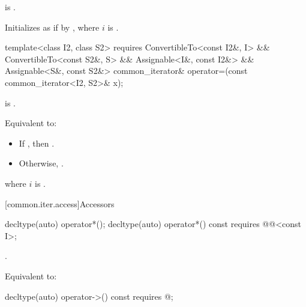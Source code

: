\begin{itemdescr}
\pnum
\expects {} is .

\pnum
\effects
Initializes  as if by
,
where $i$ is .
\end{itemdescr}

%
\begin{itemdecl}
template<class I2, class S2>
  requires ConvertibleTo<const I2&, I> && ConvertibleTo<const S2&, S> &&
           Assignable<I&, const I2&> && Assignable<S&, const S2&>
    common_iterator& operator=(const common_iterator<I2, S2>& x);
\end{itemdecl}

\begin{itemdescr}
\pnum
\expects {} is .

\pnum
\effects
Equivalent to:
\begin{itemize}
\item If , then
.

\item Otherwise, .
\end{itemize}
where $i$ is .

\pnum
\returns {}
\end{itemdescr}

[common.iter.access]{Accessors}

%
\begin{itemdecl}
decltype(auto) operator*();
decltype(auto) operator*() const
  requires @@<const I>;
\end{itemdecl}

\begin{itemdescr}
\pnum
\expects {}.

\pnum
\effects Equivalent to: 
\end{itemdescr}

%
\begin{itemdecl}
decltype(auto) operator->() const
  requires @\seebelow@;
\end{itemdecl}

